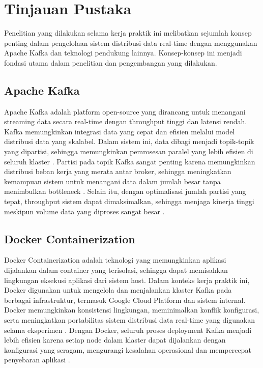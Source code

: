 \section{Tinjauan Pustaka}
\label{sec:tinjauan-pustaka}

Penelitian yang dilakukan selama kerja praktik ini melibatkan sejumlah konsep penting dalam pengelolaan sistem distribusi data real-time dengan menggunakan Apache Kafka dan teknologi pendukung lainnya. Konsep-konsep ini menjadi fondasi utama dalam penelitian dan pengembangan yang dilakukan.

\subsection{Apache Kafka}

Apache Kafka adalah platform open-source yang dirancang untuk menangani streaming data secara real-time dengan throughput tinggi dan latensi rendah. Kafka memungkinkan integrasi data yang cepat dan efisien melalui model distribusi data yang skalabel. Dalam sistem ini, data dibagi menjadi topik-topik yang dipartisi, sehingga memungkinkan pemrosesan paralel yang lebih efisien di seluruh klaster \citep{elsevier:kafka}. Partisi pada topik Kafka sangat penting karena memungkinkan distribusi beban kerja yang merata antar broker, sehingga meningkatkan kemampuan sistem untuk menangani data dalam jumlah besar tanpa menimbulkan bottleneck \citep{elsevier:kafka}. Selain itu, dengan optimalisasi jumlah partisi yang tepat, throughput sistem dapat dimaksimalkan, sehingga menjaga kinerja tinggi meskipun volume data yang diproses sangat besar \citep{elsevier:kafka}.

\subsection{Docker Containerization}

Docker Containerization adalah teknologi yang memungkinkan aplikasi dijalankan dalam container yang terisolasi, sehingga dapat memisahkan lingkungan eksekusi aplikasi dari sistem host. Dalam konteks kerja praktik ini, Docker digunakan untuk mengelola dan menjalankan klaster Kafka pada berbagai infrastruktur, termasuk Google Cloud Platform dan sistem internal. Docker memungkinkan konsistensi lingkungan, meminimalkan konflik konfigurasi, serta meningkatkan portabilitas sistem distribusi data real-time yang digunakan selama eksperimen \citep{its:docker}. Dengan Docker, seluruh proses deployment Kafka menjadi lebih efisien karena setiap node dalam klaster dapat dijalankan dengan konfigurasi yang seragam, mengurangi kesalahan operasional dan mempercepat penyebaran aplikasi \citep{its:docker}.

